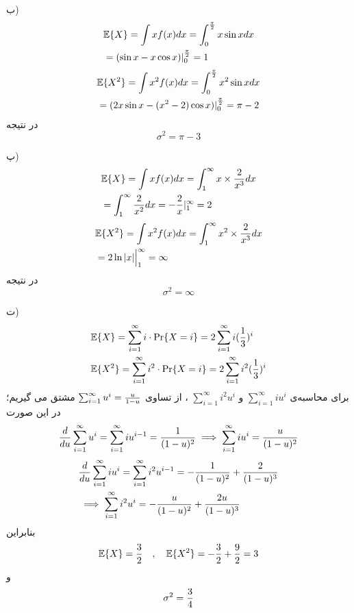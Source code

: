 \documentclass[10pt,letterpaper]{report}
\begin{document}
ب) 
\begin{equation}
\begin{split}
&
\mathbb{E}\{X\}=\int xf(x)dx=\int_0^{\pi\over 2} x\sin xdx
\\&=(\sin x-x\cos x)|_0^{\pi \over 2}=1
\end{split}
\end{equation}
\begin{equation}
\begin{split}
&
\mathbb{E}\{X^2\}=\int x^2f(x)dx=\int_0^{\pi\over 2} x^2\sin xdx
\\&=
(2x\sin x-(x^2-2)\cos x)|_0^{\pi \over 2}=\pi-2
\end{split}
\end{equation}
در نتیجه
$$
\sigma^2=\pi-3
$$

پ)
\begin{equation}
\begin{split}
&
\mathbb{E}\{X\}=\int xf(x)dx=\int_1^\infty x\times {2\over x^3}dx
\\&=
\int_1^\infty {2\over x^2}dx
=-{2\over x}|_{1}^\infty=2
\end{split}
\end{equation}
\begin{equation}
\begin{split}
&
\mathbb{E}\{X^2\}=\int x^2f(x)dx=\int_1^\infty x^2\times {2\over x^3}dx
\\&
=2\ln |x|\Big|_{1}^\infty=\infty
\end{split}
\end{equation}
در نتیجه
$$
\sigma^2=\infty
$$

ت) 
\begin{equation}
\begin{split}
&
\mathbb{E}\{X\}=\sum_{i=1}^\infty i\cdot\Pr\{X=i\}=2\sum_{i=1}^\infty i({1\over 3})^i
\\&
\mathbb{E}\{X^2\}=\sum_{i=1}^\infty i^2\cdot\Pr\{X=i\}=2\sum_{i=1}^\infty i^2({1\over 3})^i
\end{split}
\end{equation}
برای محاسبه‌ی 
$
\sum_{i=1}^\infty iu^i
$
و
$
\sum_{i=1}^\infty i^2u^i
$
، از تساوی
$
\sum_{i=1}^\infty u^i={u\over 1-u}
$
مشتق می گیریم؛ در این صورت
\begin{equation}
\begin{split}
{d\over du}\sum_{i=1}^\infty u^i=\sum_{i=1}^\infty iu^{i-1}={1\over (1-u)^2}\implies \sum_{i=1}^\infty iu^{i}={u\over (1-u)^2}
\end{split}
\end{equation}
\begin{equation}
\begin{split}
&{d\over du}\sum_{i=1}^\infty iu^i=\sum_{i=1}^\infty i^2u^{i-1}=-{1\over (1-u)^2}+{2\over (1-u)^3}
\\&
\implies \sum_{i=1}^\infty i^2u^{i}=-{u\over (1-u)^2}+{2u\over (1-u)^3}
\end{split}
\end{equation}
بنابراین 
$$
\mathbb{E}\{X\}={3\over 2}\quad,\quad \mathbb{E}\{X^2\}=-{3\over 2}+{9\over 2}=3
$$
و
$$
\sigma^2={3\over 4}
$$
\end{document}
